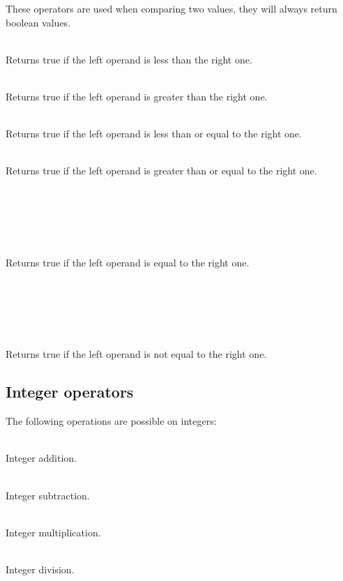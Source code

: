 These operators are used when comparing two values, they will always return
boolean values.
\begin{dlist}
  \item {}\\
    Returns true if the left operand is less than the right one.
  \item {}\\
    Returns true if the left operand is greater than the right one.
  \item {}\\
    Returns true if the left operand is less than or equal to the right one.
  \item {}\\
    Returns true if the left operand is greater than or equal to the right one.
  \item {}\\
    \\
    \\
    \\
    \\
    Returns true if the left operand is equal to the right one.
  \item {}\\
    \\
    \\
    \\
    \\
    Returns true if the left operand is not equal to the right one.
\end{dlist}

\subsection{Integer operators}

The following operations are possible on integers:
\begin{dlist}
  \item {} \\
    Integer addition.
  \item {} \\
    Integer subtraction.
  \item {} \\
    Integer multiplication.
  \item {} \\
    Integer division.
\end{dlist}

